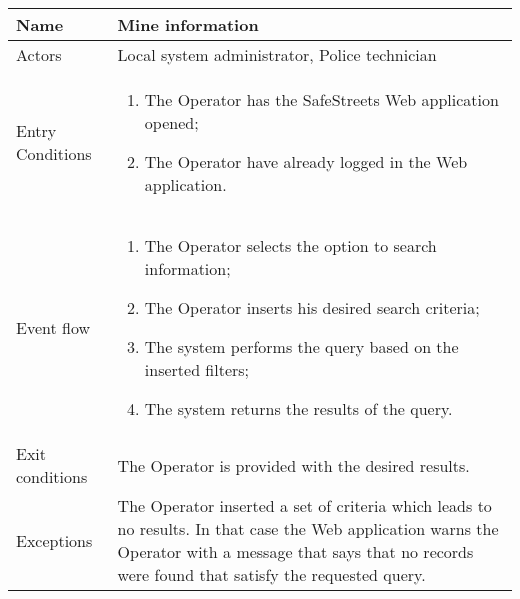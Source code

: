 \begin{table}[H]
  \centering
  \begin{tabularx}{\textwidth}{ |l|X| }
    \hline
    Name & Mine information\\
    \hline
    Actors & Local system administrator, Police technician\\
    \hline
    Entry Conditions & \begin{enumerate}[noitemsep]
                        \item The Operator has the SafeStreets Web application opened;
                        \item The Operator have already logged in the Web application. 
                      \end{enumerate}\\
    \hline
    Event flow & \begin{enumerate}[noitemsep]
                    \item The Operator selects the option to search information;
                    \item The Operator inserts his desired search criteria;
                    \item The system performs the query based on the inserted filters;
                    \item The system returns the results of the query.              
                \end{enumerate}\\
    \hline
    Exit conditions & The Operator is provided with the desired results.\\ 
    \hline
    Exceptions & The Operator inserted a set of criteria which leads to no results. In that case the Web application warns the Operator with a message that says that no records were found that satisfy the requested query. \\
    \hline
  \end{tabularx}
\end{table}
